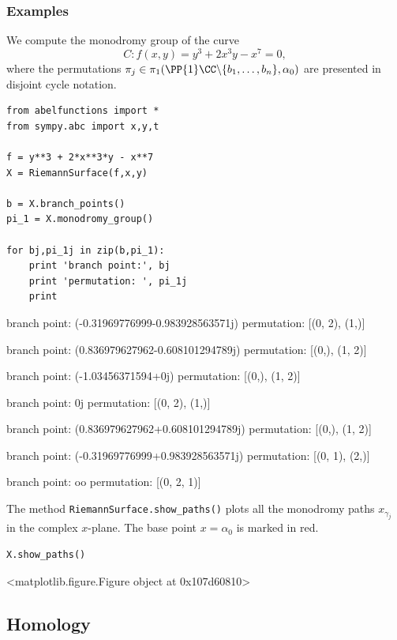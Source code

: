 %
\subsubsection*{Examples}
%

We compute the monodromy group of the curve
\[
    C : f(x,y) = y^3 + 2x^3y - x^7 = 0,
\]
where the permutations $\pi_j \in \pi_1(\PP{1}\CC \backslash \{b_1,
\ldots, b_n\}, \alpha_0)$ are presented in disjoint cycle notation.
\begin{lstlisting}
from abelfunctions import *
from sympy.abc import x,y,t

f = y**3 + 2*x**3*y - x**7
X = RiemannSurface(f,x,y)

b = X.branch_points()
pi_1 = X.monodromy_group()

for bj,pi_1j in zip(b,pi_1):
    print 'branch point:', bj
    print 'permutation: ', pi_1j
    print
\end{lstlisting}
\begin{pyoutput}
branch point: (-0.31969776999-0.983928563571j)
permutation:  [(0, 2), (1,)]

branch point: (0.836979627962-0.608101294789j)
permutation:  [(0,), (1, 2)]

branch point: (-1.03456371594+0j)
permutation:  [(0,), (1, 2)]

branch point: 0j
permutation:  [(0, 2), (1,)]

branch point: (0.836979627962+0.608101294789j)
permutation:  [(0,), (1, 2)]

branch point: (-0.31969776999+0.983928563571j)
permutation:  [(0, 1), (2,)]

branch point: oo
permutation:  [(0, 2, 1)]
\end{pyoutput}
The method \verb=RiemannSurface.show_paths()= plots all the monodromy
paths $x_{\gamma_j}$ in the complex $x$-plane. The base point
$x=\alpha_0$ is marked in red.
\begin{lstlisting}[firstnumber=14]
X.show_paths()
\end{lstlisting}
\begin{pyoutput}
<matplotlib.figure.Figure object at 0x107d60810>
\end{pyoutput}


\subsection{Homology} \label{sec: homology}

